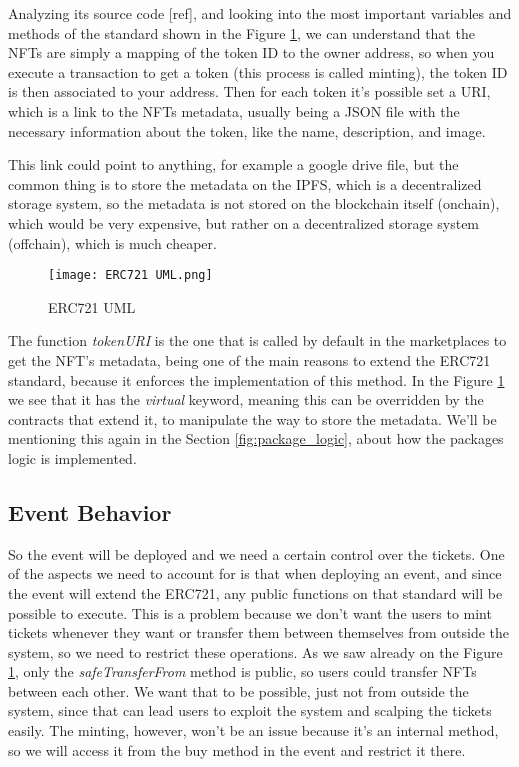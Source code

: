 Analyzing its source code [ref], and looking into the most important variables and methods of the standard shown in the Figure \ref{fig:erc721_uml}, we can understand that the NFTs are simply a mapping of the token ID to the owner address, so when you execute a transaction to get a token (this process is called minting), the token ID is then associated to your address. Then for each token it's possible set a URI, which is a link to the NFTs metadata, usually being a JSON file with the necessary information about the token, like the name, description, and image.

This link could point to anything, for example a google drive file, but the common thing is to store the metadata on the IPFS, which is a decentralized storage system, so the metadata is not stored on the blockchain itself (onchain), which would be very expensive, but rather on a decentralized storage system (offchain), which is much cheaper.

\begin{figure}[H]
    \texttt{[image: ERC721 UML.png]}
    \centering
    \caption{ERC721 UML}
    \label{fig:erc721_uml}
\end{figure}

The function \textit{tokenURI} is the one that is called by default in the marketplaces to get the NFT's metadata, being one of the main reasons to extend the ERC721 standard, because it enforces the implementation of this method. In the Figure \ref{fig:erc721_uml} we see that it has the \textit{virtual} keyword, meaning this can be overridden by the contracts that extend it, to manipulate the way to store the metadata. We'll be mentioning this again in the Section \ref{fig:package_logic}, about how the packages logic is implemented.

\subsection{Event Behavior}
\label{subsec:event_behavior}

So the event will be deployed and we need a certain control over the tickets. One of the aspects we need to account for is that when deploying an event, and since the event will extend the ERC721, any public functions on that standard will be possible to execute. This is a problem because we don't want the users to mint tickets whenever they want or transfer them between themselves from outside the system, so we need to restrict these operations. As we saw already on the Figure \ref{fig:erc721_uml}, only the \textit{safeTransferFrom} method is public, so users could transfer NFTs between each other. We want that to be possible, just not from outside the system, since that can lead users to exploit the system and scalping the tickets easily. The minting, however, won't be an issue because it's an internal method, so we will access it from the buy method in the event and restrict it there.

